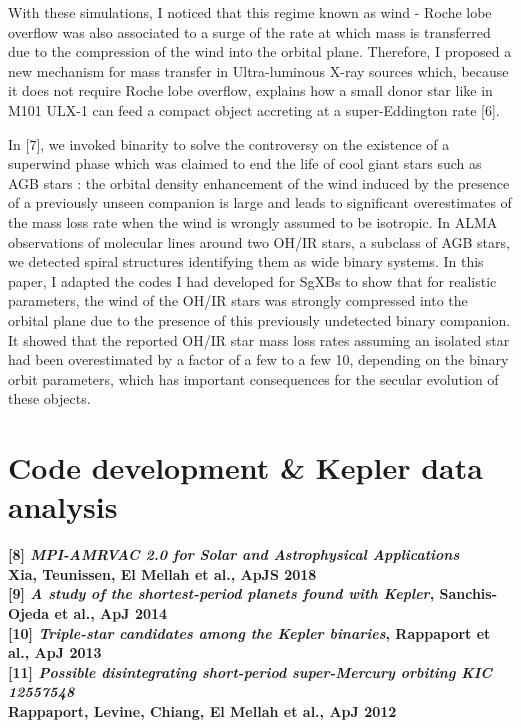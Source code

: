 \documentclass[11pt,onecolumn]{article}
\newcommand{\sgxs}{SgXBs\xspace}
\begin{document}
With these simulations, I noticed that this regime known as wind - Roche lobe overflow \citep{Mohamed2011} was also associated to a surge of the rate at which mass is transferred due to the compression of the wind into the orbital plane. Therefore, I proposed a new mechanism for mass transfer in Ultra-luminous X-ray sources which, because it does not require Roche lobe overflow, explains how a small donor star like in M101 ULX-1 can feed a compact object accreting at a super-Eddington rate [6]. 

In [7], we invoked binarity to solve the controversy on the existence of a superwind phase which was claimed to end the life of cool giant stars such as AGB stars : the orbital density enhancement of the wind induced by the presence of a previously unseen companion is large and leads to significant overestimates of the mass loss rate when the wind is wrongly assumed to be isotropic. In ALMA observations of molecular lines around two OH/IR stars, a subclass of AGB stars, we detected spiral structures identifying them as wide binary systems. In this paper, I adapted the codes I had developed for \sgxs to show that for realistic parameters, the wind of the OH/IR stars was strongly compressed into the orbital plane due to the presence of this previously undetected binary companion. It showed that the reported OH/IR star mass loss rates assuming an isolated star had been overestimated by a factor of a few to a few 10, depending on the binary orbit parameters, which has important consequences for the secular evolution of these objects.

\section*{Code development \& Kepler data analysis}

\footnotesize
\textbf{[8] \textit{MPI-AMRVAC 2.0 for Solar and Astrophysical Applications}}\\
\hspace*{16pt}\textbf{Xia, Teunissen, El Mellah et al., ApJS 2018}\\
\textbf{[9] \textit{A study of the shortest-period planets found with Kepler}, Sanchis-Ojeda et al., ApJ 2014}\\
\textbf{[10] \textit{Triple-star candidates among the Kepler binaries}, Rappaport et al., ApJ 2013}\\
\textbf{[11] \textit{Possible disintegrating short-period super-Mercury orbiting KIC 12557548}}\\
\hspace*{21pt}\textbf{Rappaport, Levine, Chiang, El Mellah et al., ApJ 2012}\\
\end{document}

